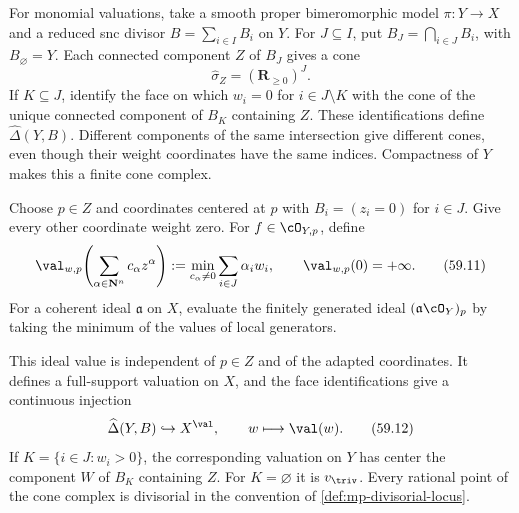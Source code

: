 For monomial valuations, take a smooth proper bimeromorphic model
$\pi:Y\to X$ and a reduced snc divisor $B=\sum_{i\in I}B_i$ on $Y$.
For $J\subseteq I$, put $B_J=\bigcap_{i\in J}B_i$, with
$B_\varnothing=Y$. Each connected component $Z$ of $B_J$ gives a cone
\[
                         \widehat\sigma_Z=(\mathbf R_{\geq0})^J.
\tag{59.10}\label{eq:mp-monomial-cone}
\]
If $K\subseteq J$, identify the face on which $w_i=0$ for
$i\in J\setminus K$ with the cone of the unique connected component
of $B_K$ containing $Z$. These identifications define
$\widehat\Delta(Y,B)$. Different components of the same intersection
give different cones, even though their weight coordinates have the
same indices. Compactness of $Y$ makes this a finite cone complex.

Choose $p\in Z$ and coordinates centered at $p$ with
$B_i=(z_i=0)$ for $i\in J$. Give every other coordinate weight zero.
For $f\in\cO_{Y,p}$, define
\[
 \val_{w,p}\!\left(\sum_{\alpha\in\mathbf N^n}c_\alpha z^\alpha\right)
   :=\min_{c_\alpha\ne0}\sum_{i\in J}\alpha_iw_i,
 \qquad \val_{w,p}(0)=+\infty.
\tag{59.11}\label{eq:mp-monomial-local}
\]
For a coherent ideal $\mathfrak a$ on $X$, evaluate the finitely
generated ideal $(\mathfrak a\cO_Y)_p$ by taking the minimum of
the values of local generators.

\begin{proposition}\label{prop:mp-monomial-globalization}
This ideal value is independent of $p\in Z$ and of the adapted
coordinates. It defines a full-support valuation on $X$, and the
face identifications give a continuous injection
\[
 \widehat\Delta(Y,B)\hookrightarrow X^{\val},
 \qquad w\longmapsto\val(w).
\tag{59.12}\label{eq:mp-cone-complex-embedding}
\]
If $K=\{i\in J:w_i>0\}$, the corresponding valuation on $Y$ has
center the component $W$ of $B_K$ containing $Z$. For $K=\varnothing$
it is $v_{\triv}$. Every rational point of the cone complex is
divisorial in the convention of \cref{def:mp-divisorial-locus}.
\end{proposition}

